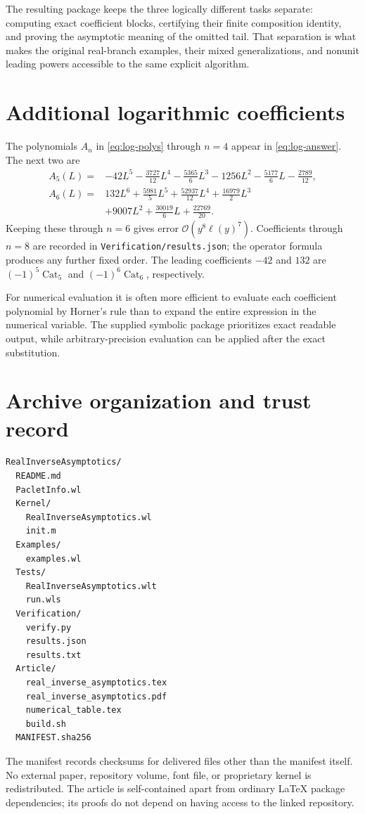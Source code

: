 \documentclass[11pt,a4paper]{article}
\numberwithin{equation}{section}
\theoremstyle{definition}
\newcommand{\OO}{\mathcal O}
\newcommand{\code}[1]{\texttt{#1}}
\begin{document}
The resulting package keeps the three logically different tasks separate:
computing exact coefficient blocks, certifying their finite composition
identity, and proving the asymptotic meaning of the omitted tail. That
separation is what makes the original real-branch examples, their mixed
generalizations, and nonunit leading powers accessible to the same
explicit algorithm.

\appendix
\section{Additional logarithmic coefficients}\label{app:coefficients}
The polynomials $A_n$ in \eqref{eq:log-polys} through $n=4$ appear in
\eqref{eq:log-answer}. The next two are
\begin{align*}
 A_5(L)={}&-42L^5-\frac{3727}{12}L^4-\frac{5365}{6}L^3
                -1256L^2-\frac{5177}{6}L-\frac{2789}{12},\\
 A_6(L)={}&132L^6+\frac{5981}{5}L^5+\frac{52937}{12}L^4
                +\frac{16979}{2}L^3\\
          &+9007L^2+\frac{30019}{6}L+\frac{22769}{20}.
\end{align*}
Keeping these through $n=6$ gives error
$\OO(y^8\ell(y)^7)$. Coefficients through $n=8$ are recorded in
\code{Verification/results.json}; the operator formula produces any
further fixed order. The leading coefficients $-42$ and $132$ are
$(-1)^5\operatorname{Cat}_5$ and
$(-1)^6\operatorname{Cat}_6$, respectively.

For numerical evaluation it is often more efficient to evaluate each
coefficient polynomial by Horner's rule than to expand the entire
expression in the numerical variable. The supplied symbolic package
prioritizes exact readable output, while arbitrary-precision evaluation
can be applied after the exact substitution.

\clearpage
\section{Archive organization and trust record}
\begin{lstlisting}[language={}]
RealInverseAsymptotics/
  README.md
  PacletInfo.wl
  Kernel/
    RealInverseAsymptotics.wl
    init.m
  Examples/
    examples.wl
  Tests/
    RealInverseAsymptotics.wlt
    run.wls
  Verification/
    verify.py
    results.json
    results.txt
  Article/
    real_inverse_asymptotics.tex
    real_inverse_asymptotics.pdf
    numerical_table.tex
    build.sh
  MANIFEST.sha256
\end{lstlisting}
The manifest records checksums for delivered files other than the
manifest itself. No external paper, repository volume, font file, or
proprietary kernel is redistributed. The article is self-contained apart
from ordinary LaTeX package dependencies; its proofs do not depend on
having access to the linked repository.
\end{document}
